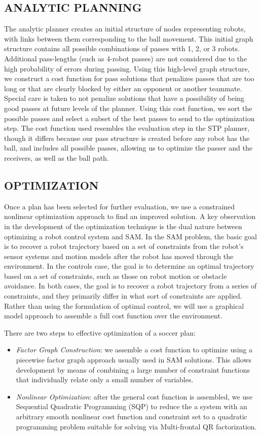 \documentclass[a4paper, 10pt, conference]{ieeeconf}      %
\begin{document}
\subsection{ANALYTIC PLANNING}
The analytic planner creates an initial structure of nodes representing robots, with links between them corresponding to the ball movement. This initial graph structure contains all possible combinations of passes with 1, 2, or 3 robots. Additional pass-lengths (such as 4-robot passes) are not considered due to the high probability of errors during passing. Using this high-level graph structure, we construct a cost function for pass solutions that penalizes passes that are too long or that are clearly blocked by either an opponent or another teammate. Special care is taken to not penalize solutions that have a possibility of being good passes at future levels of the planner. Using this cost function, we sort the possible passes and select a subset of the best passes to send to the optimization step.
The cost function used resembles the evaluation step in the STP planner, though it differs because our pass structure is created before any robot has the ball, and includes all possible passes, allowing us to optimize the passer and the receivers, as well as the ball path.

\subsection{OPTIMIZATION}
Once a plan has been selected for further evaluation, we use a constrained nonlinear optimization approach to find an improved solution.  A key observation in the development of the optimization technique is the dual nature between optimizing a robot control system and SAM.  In the SAM problem, the basic goal is to recover a robot trajectory based on a set of constraints from the robot's sensor systems and motion models after the robot has moved through the environment.  In the controls case, the goal is to determine an optimal trajectory based on a set of constraints, such as those on robot motion or obstacle avoidance.  In both cases, the goal is to recover a robot trajectory from a series of constraints, and they primarily differ in what sort of constraints are applied.  Rather than using the formulation of optimal control, we will use a graphical model approach to assemble a full cost function over the environment.  

There are two steps to effective optimization of a soccer plan:
\begin{itemize}
 \item \textit{Factor Graph Construction}: we assemble a cost function to optimize using a piecewise factor graph approach usually used in SAM solutions.  This allows development by means of combining a large number of constraint functions that individually relate only a small number of variables.
\item \textit{Nonlinear Optimization}: after the general cost function is assembled, we use Sequential Quadratic Programming (SQP) to reduce the a system with an arbitrary smooth nonlinear cost function and constraint set to a quadratic programming problem suitable for solving via Multi-frontal QR factorization.  
 \end{itemize}
\end{document}
